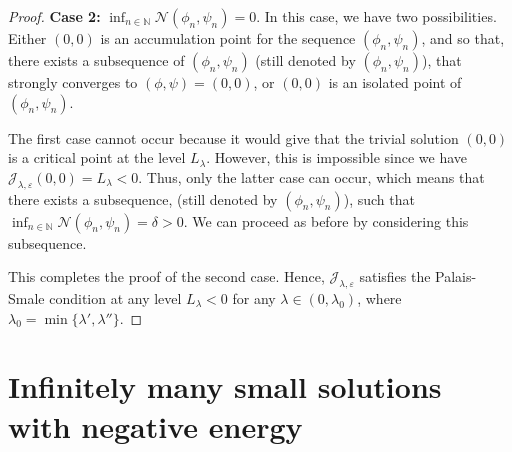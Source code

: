 \documentclass[reqno]{amsart}
\begin{document}
\begin{proof}
\noindent\textbf{Case 2:}
 $\inf_{n\in \mathbb{N}} \mathcal{N}(\phi_n,\psi_n)=0$. In this case, we have two 
possibilities. Either $(0,0)$ is an accumulation point for the sequence 
$(\phi_n,\psi_n)$, and so that, there exists a subsequence of $(\phi_n,\psi_n)$ 
(still denoted by $(\phi_n,\psi_n)$), that strongly converges to $(\phi,\psi)=(0,0)$, 
or $(0,0)$ is an isolated point of $(\phi_n,\psi_n)$.

The first case cannot occur because it would give that the trivial solution $(0,0)$ 
is a critical point at the level $L_\lambda$. However, this is impossible since we have 
$\mathcal{J}_{\lambda,\varepsilon}(0,0)=L_\lambda<0$. Thus, only the latter case 
can occur, which means that there exists a subsequence, (still denoted by 
$(\phi_n,\psi_n)$), such that $\inf_{n\in\mathbb{N}}\mathcal{N}(\phi_n,\psi_n)=\delta>0$. 
We can proceed as before by considering this subsequence.

This completes the proof of the second case. 
Hence, $\mathcal{J}_{\lambda,\varepsilon}$ satisfies the Palais-Smale condition at any 
level $L_\lambda<0$ for any $\lambda\in (0,\lambda_0)$, where 
$\lambda_0=\min \lbrace\lambda',\lambda'' \rbrace$.
\end{proof}

\section{Infinitely many small solutions with negative energy}
\end{document}
